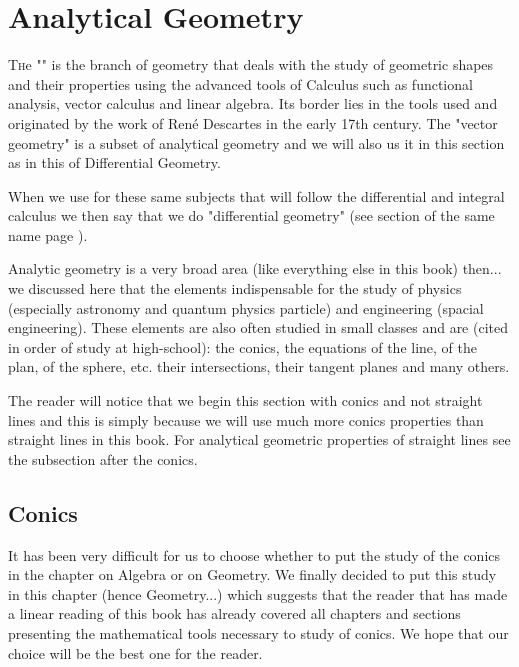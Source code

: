 	\newpage
	\thispagestyle{empty}
	\mbox{}		
	\section{Analytical Geometry}

	\lettrine[lines=4]{\color{BrickRed}T}he "" is the branch of geometry that deals with the study of geometric shapes and their properties using the advanced tools of Calculus such as functional analysis, vector calculus and linear algebra. Its border lies in the tools used and originated by the work of René Descartes in the early 17th century. The "vector geometry" is a subset of analytical geometry and we will also us it in this section as in this of Differential Geometry.

	\begin{tcolorbox}[title=Remark,colframe=black,arc=10pt]
	When we use for these same subjects that will follow the differential and integral calculus we then say that we do "differential geometry" (see section of the same name page \pageref{differential geometry}).
	\end{tcolorbox}
	
	Analytic geometry is a very broad area (like everything else in this book) then... we discussed here that the elements indispensable for the study of physics (especially astronomy and quantum physics particle) and engineering (spacial engineering). These elements are also often studied in small classes and are (cited in order of study at high-school): the conics, the equations of the line, of the plan, of the sphere, etc. their intersections, their tangent planes and many others.	
	
	The reader will notice that we begin this section with conics and not straight lines and this is simply because we will use much more conics properties than straight lines in this book. For analytical geometric properties of straight lines see the subsection after the conics.

	\subsection{Conics}\label{conics}
	It has been very difficult for us to choose whether to put the study of the conics in the chapter on Algebra or on Geometry. We finally decided to put this study in this chapter (hence Geometry...) which suggests that the reader that has made a linear reading of this book has already covered all chapters and sections presenting the mathematical tools necessary to study of conics. We hope that our choice will be the best one for the reader.


